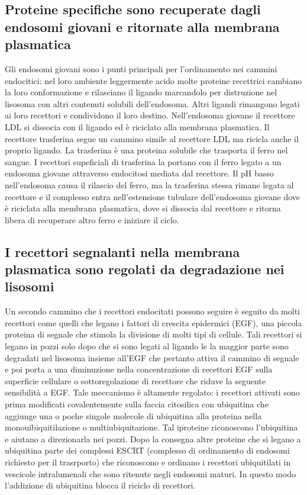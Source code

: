 \subsection{Proteine specifiche sono recuperate dagli endosomi giovani e ritornate alla membrana plasmatica}
Gli endosomi giovani sono i punti principali per l'ordinamento nei cammini endocitici: nel loro ambiente leggermente acido molte proteine recettrici cambiano la loro conformazione e 
rilasciano il ligando marcandolo per distruzione nel lisosoma con altri contenuti solubili dell'endosoma. Altri ligandi rimangono legati ai loro recettori e condividono il loro destino.
Nell'endosoma giovane il recettore LDL si dissocia con il ligando ed \`e riciclato alla membrana plasmatica. Il recettore trasferina segue un cammino simile al recettore LDL ma ricicla
anche il proprio ligando. La trasferina \`e una proteina solubile che trasporta il ferro nel sangue. I recettori supeficiali di trasferina la portano con il ferro legato a un endosoma 
giovane attraverso endocitosi mediata dal recettore. Il  pH basso nell'endosoma causa il rilascio del ferro, ma la trasferina stessa rimane legata al recettore e il complesso entra
nell'estensione tubulare dell'endosoma giovane dove \`e riciclata alla membrana plasmatica, dove si dissocia dal recettore e ritorna libera di recuperare altro ferro e iniziare il ciclo.
\subsection{I recettori segnalanti nella membrana plasmatica sono regolati da degradazione nei lisosomi}
Un secondo cammino che i recettori endocitati possono seguire \`e seguito da molti recettori come quelli che legano i fattori di crescita epidermici (EGF), una piccola proteina di 
segnale che stimola la divisione di molti tipi di cellule. Tali recettori si legano in pozzi solo dopo che si sono legati al ligando le la maggior parte sono degradati nel lisosoma 
insieme all'EGF che pertanto attiva il cammino di segnale e poi porta a una diminuzione nella concentrazione di recettori EGF sulla superficie cellulare o sottoregolazione di recettore 
che riduve la seguente sensibilit\`a a EGF. Tale meccanismo \`e altamente regolato: i recettori attivati sono prima modificati covalentemente sulla faccia citosilica con ubiquitina che
aggiunge una o poche singole molecole di ubiquitina alla proteina nella monouibiquitilazione o multiubiquitazione. Tal iproteine riconoscono l'ubiquitina e aiutano a direzionarla
nei pozzi. Dopo la consegna altre proteine che si legano a ubiquitina parte dei complessi ESCRT (complesso di ordinamento di endosomi richiesto per il trasrporto) che riconoscono e
ordinano i recettori ubiquitilati in vescicole intralumenali che sono ritenute negli endosomi maturi. In questo modo l'addizione di ubiquitina blocca il riciclo di recettori.
